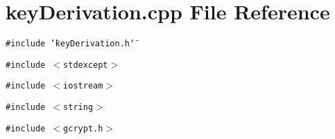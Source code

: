 \section{key\-Derivation.cpp File Reference}
\label{keyDerivation_8cpp}
{\tt \#include \char`\"{}key\-Derivation.h\char`\"{}}\par
{\tt \#include $<$stdexcept$>$}\par
{\tt \#include $<$iostream$>$}\par
{\tt \#include $<$string$>$}\par
{\tt \#include $<$gcrypt.h$>$}\par

